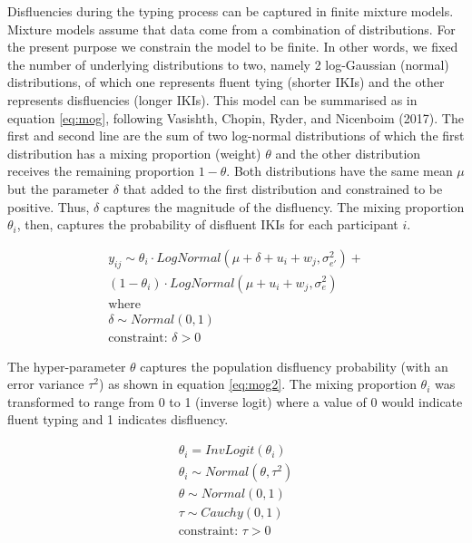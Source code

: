 \documentclass[english,jou,floatsintext]{apa7}
\begin{document}
Disfluencies during the typing process can be captured in finite mixture models. Mixture models assume that data come from a combination of distributions. For the present purpose we constrain the model to be finite. In other words, we fixed the number of underlying distributions to two, namely 2 log-Gaussian (normal) distributions, of which one represents fluent tying (shorter IKIs) and the other represents disfluencies (longer IKIs). This model can be summarised as in equation \ref{eq:mog}, following Vasishth, Chopin, Ryder, and Nicenboim (2017). The first and second line are the sum of two log-normal distributions of which the first distribution has a mixing proportion (weight) \(\theta\) and the other distribution receives the remaining proportion \(1-\theta\). Both distributions have the same mean \(\mu\) but the parameter \(\delta\) that added to the first distribution and constrained to be positive. Thus, \(\delta\) captures the magnitude of the disfluency. The mixing proportion \(\theta_i\), then, captures the probability of disfluent IKIs for each participant \(i\).

\[
\tag{7}
\begin{aligned}
    y_{ij} \sim \theta_i \cdot LogNormal(\mu + \delta + u_i + w_j, \sigma_{e'}^2) +\\
        (1 - \theta_i) \cdot LogNormal(\mu + u_i + w_j, \sigma_{e}^2)\\
        \text{where}\\
        \delta \sim Normal(0,1)\\
        \text{constraint: } \delta > 0
\end{aligned}   
\label{eq:mog}
\]

The hyper-parameter \(\theta\) captures the population disfluency probability (with an error variance \(\tau^2\)) as shown in equation \ref{eq:mog2}. The mixing proportion \(\theta_i\) was transformed to range from 0 to 1 (inverse logit) where a value of 0 would indicate fluent typing and 1 indicates disfluency.

\[
\tag{8}
\begin{aligned}
        \theta_i = InvLogit(\theta_i)\\
        \theta_i \sim Normal(\theta,\tau^2)\\
        \theta \sim Normal(0,1)\\
        \tau \sim Cauchy(0,1)\\
        \text{constraint: } \tau > 0
\end{aligned}   
\label{eq:mog2}
\]
\end{document}
